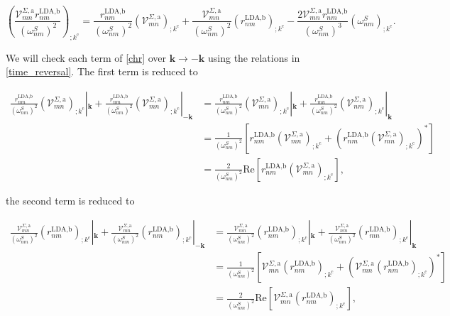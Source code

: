\begin{equation}\label{chr}
\left(\frac{\mathcal{V}^{\Sigma,\text{a}}_{mn}r^{\text{LDA,b}}_{nm}}{(\omega^{S}_{nm})^2}\right)_{;k^{\text{c}}} = \frac{r^{\text{LDA,b}}_{nm}}{(\omega^{S}_{nm})^2}\left(\mathcal{V} ^{\Sigma,\text{a}}_{mn}\right)_{;k^{\text{c}}} + \frac{\mathcal{V}^{\Sigma,\text{a}}_{mn}}{(\omega^{S}_{nm})^2}\left(r^{\text{LDA,b}}_{nm}\right)_{;k^{\text{c}}} - \frac{2\mathcal{V}^{\Sigma,\text{a}}_{mn}r^{\text{LDA,b}}_{nm}}{(\omega^{S}_{nm})^3}\left(
\omega^{S}_{nm}\right)_{;k^{\text{c}}}.
\end{equation}

We will check each term of \eqref{chr} over $\mathbf{k} \rightarrow - \mathbf{k}$ using the relations in \eqref{time_reversal}. The first term is reduced to

\begin{align}\label{first_term_gen_deriv}
\frac{r^{\text{LDA,b}}_{nm}}{(\omega^{S}_{nm})^{2}}\left(\mathcal{V}^{\Sigma,\text{a}}_{mn}\right)_{;k^{\text{c}}}|_{\mathbf{k}} + \frac{r^{\text{LDA,b}}_{nm}}{(\omega^{S}_{nm})^{2}}\left(\mathcal{V}^{\Sigma,\text{a}}_{mn}\right)_{;k^{\text{c}}}|_{-\mathbf{k}}
&= \frac{r^{\text{LDA,b}}_{nm}}{(\omega^{S}_{nm})^{2}}\left(\mathcal{V}^{\Sigma,\text{a}}_{mn}\right)_{;k^{\text{c}}}|_{\mathbf{k}} + \frac{r^{\text{LDA,b}}_{mn}}{(\omega^{S}_{nm})^{2}}\left(\mathcal{V}^{\Sigma,\text{a}}_{nm}\right)_{;k^{\text{c}}}|_{\mathbf{k}}\nonumber\\
&= \frac{1}{(\omega^{S}_{nm})^{2}}\left[r^{\text{LDA,b}}_{nm}\left(\mathcal{V}^{\Sigma,\text{a}}_{mn}\right)_{;k^{\text{c}}} + \left(r^{\text{LDA,b}}_{nm}\left(\mathcal{V}^{\Sigma,\text{a}}_{mn}\right)_{;k^{\text{c}}}\right)^*\right]\nonumber\\
&= \frac{2}{(\omega^{S}_{nm})^{2}}\mathrm{Re}\left[r^{\text{LDA,b}}_{nm}\left(\mathcal{V}^{\Sigma,\text{a}}_{mn}\right)_{;k^{\text{c}}}\right],
\end{align}

the second term is reduced to

\begin{align}\label{second_term_gen_deriv}
\frac{\mathcal{V}^{\Sigma,\text{a}}_{mn}}{(\omega^{S}_{nm})^{2}}\left(r^{\text{LDA,b}}_{nm}\right)_{;k^{\text{c}}}|_{\mathbf{k}} + \frac{\mathcal{V}^{\Sigma,\text{a}}_{mn}}{(\omega^{S}_{nm})^{2}}\left(r^{\text{LDA,b}}_{nm}\right)_{;k^{\text{c}}}|_{-\mathbf{k}}
&= \frac{\mathcal{V}^{\Sigma,\text{a}}_{mn}}{(\omega^{S}_{nm})^{2}}\left(r^{\text{LDA,b}}_{nm}\right)_{;k^{\text{c}}}|_{\mathbf{k}} + \frac{\mathcal{V}^{\Sigma,\text{a}}_{nm}}{(\omega^{S}_{nm})^{2}}\left(r^{\text{LDA,b}}_{mn}\right)_{;k^{\text{c}}}|_{\mathbf{k}}\nonumber\\
&= \frac{1}{(\omega^{S}_{nm})^{2}}\left[\mathcal{V}^{\Sigma,\text{a}}_{mn}\left(r^{\text{LDA,b}}_{nm}\right)_{;k^{\text{c}}} + \left(\mathcal{V}^{\Sigma,\text{a}}_{mn}\left(r^{\text{LDA,b}}_{nm}\right)_{;k^{\text{c}}}\right)^*\right]\nonumber\\
&= \frac{2}{(\omega^{S}_{nm})^{2}}\mathrm{Re}\left[\mathcal{V}^{\Sigma,\text{a}}_{mn}\left(r^{\text{LDA,b}}_{nm}\right)_{;k^{\text{c}}}\right],
\end{align}

